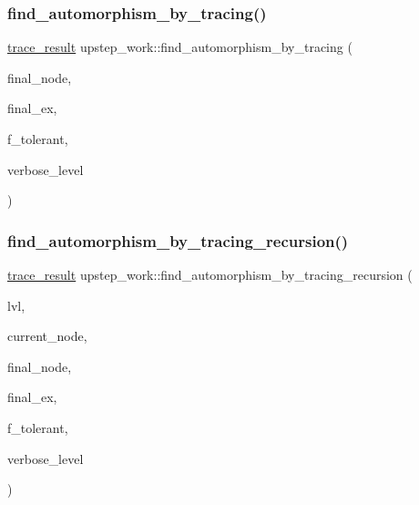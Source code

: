 \subsubsection{\texorpdfstring{find\+\_\+automorphism\+\_\+by\+\_\+tracing()}{find\_automorphism\_by\_tracing()}}
{\footnotesize\ttfamily \mbox{\hyperlink{snakesandladders_8h_ac88defea077c05403847ed918e76bdde}{trace\+\_\+result}} upstep\+\_\+work\+::find\+\_\+automorphism\+\_\+by\+\_\+tracing (\begin{DoxyParamCaption}\item[{\mbox{\hyperlink{galois_8h_a09fddde158a3a20bd2dcadb609de11dc}{I\+NT}} \&}]{final\+\_\+node,  }\item[{\mbox{\hyperlink{galois_8h_a09fddde158a3a20bd2dcadb609de11dc}{I\+NT}} \&}]{final\+\_\+ex,  }\item[{\mbox{\hyperlink{galois_8h_a09fddde158a3a20bd2dcadb609de11dc}{I\+NT}}}]{f\+\_\+tolerant,  }\item[{\mbox{\hyperlink{galois_8h_a09fddde158a3a20bd2dcadb609de11dc}{I\+NT}}}]{verbose\+\_\+level }\end{DoxyParamCaption})}

\mbox{\label{classupstep__work_a621a83906c4c31d4de34963f6eaa668d}} 
\subsubsection{\texorpdfstring{find\+\_\+automorphism\+\_\+by\+\_\+tracing\+\_\+recursion()}{find\_automorphism\_by\_tracing\_recursion()}}
{\footnotesize\ttfamily \mbox{\hyperlink{snakesandladders_8h_ac88defea077c05403847ed918e76bdde}{trace\+\_\+result}} upstep\+\_\+work\+::find\+\_\+automorphism\+\_\+by\+\_\+tracing\+\_\+recursion (\begin{DoxyParamCaption}\item[{\mbox{\hyperlink{galois_8h_a09fddde158a3a20bd2dcadb609de11dc}{I\+NT}}}]{lvl,  }\item[{\mbox{\hyperlink{galois_8h_a09fddde158a3a20bd2dcadb609de11dc}{I\+NT}}}]{current\+\_\+node,  }\item[{\mbox{\hyperlink{galois_8h_a09fddde158a3a20bd2dcadb609de11dc}{I\+NT}} \&}]{final\+\_\+node,  }\item[{\mbox{\hyperlink{galois_8h_a09fddde158a3a20bd2dcadb609de11dc}{I\+NT}} \&}]{final\+\_\+ex,  }\item[{\mbox{\hyperlink{galois_8h_a09fddde158a3a20bd2dcadb609de11dc}{I\+NT}}}]{f\+\_\+tolerant,  }\item[{\mbox{\hyperlink{galois_8h_a09fddde158a3a20bd2dcadb609de11dc}{I\+NT}}}]{verbose\+\_\+level }\end{DoxyParamCaption})}

